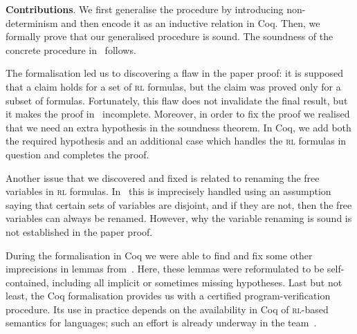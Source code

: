 \documentclass[conference]{IEEEtran}
\newenvironment{todo}{\medskip\hrule\smallskip\noindent}{\smallskip\hrule\medskip}
\newcommand{\dl}[1]{\begin{todo}\textcolor{blue}{Dorel:}\\ \color{red}{#1}\color{black}\end{todo}}
\newcommand{\dl}[1]{}
\newcommand{\ML}{\textsc{ml}\xspace}
\newcommand{\RL}{\textsc{rl}\xspace}
\begin{document}
{\bf Contributions}.
We first generalise the procedure by introducing non-determinism and then encode it as an inductive relation in Coq.
Then, we formally prove that our generalised procedure is sound. 
The soundness of the concrete procedure in~\cite{lucanu-rusu-arusoaie-nowak-LRC2015}  follows.

The formalisation led us to discovering a flaw in the paper proof: 
it is supposed that a claim holds for a set of \RL formulas, but the claim was proved only for a subset of formulas.
Fortunately, this flaw does not invalidate the final result, but it makes the proof in~\cite{lucanu-rusu-arusoaie-nowak-LRC2015} incomplete.
Moreover, in order to fix the proof we realised that we need an extra hypothesis in the soundness theorem.
In Coq, we add both the required hypothesis and an additional case which handles the \RL formulas in question and completes the proof.


Another issue that we discovered and fixed is related to renaming the free variables in \RL formulas.
In~\cite{lucanu-rusu-arusoaie-nowak-LRC2015} this is imprecisely handled using an assumption saying that certain sets of variables are disjoint, and if they are not, then the free variables can always be renamed. 
However, why the variable renaming is sound is not established in the paper proof.


During the formalisation in Coq we were able to find and fix some other imprecisions in lemmas from~\cite{lucanu-rusu-arusoaie-nowak-LRC2015}.
Here, these lemmas were reformulated to be self-contained, including all implicit or sometimes missing hypotheses.
Last but not least, the Coq formalisation provides us with a certified program-verification procedure. Its use in practice depends on the availability in Coq of \RL-based semantics for languages; such an effort is already underway in the \K team~\cite{moore-rosu-2015-tr}.\\
\end{document}
